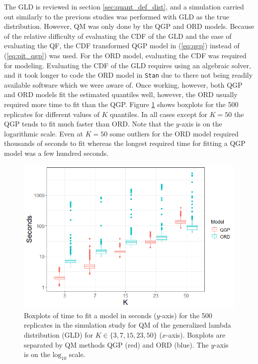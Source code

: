 \documentclass[preprint,12pt,authoryear]{elsarticle}
\begin{document}
The GLD is reviewed in section \ref{sec:quant_def_dist}, and a simulation carried out similarly to the previous studies was performed with GLD as the true distribution. However, QM was only done by the QGP and ORD models. Because of the relative difficulty of evaluating the CDF of the GLD and the ease of evaluating the QF, the CDF transformed QGP model in (\ref{eq:qgp}) instead of (\ref{eq:pit_qgp}) was used. For the ORD model, evaluating the CDF was required for modeling. Evaluating the CDF of the GLD requires using an algebraic solver, and it took longer to code the ORD model in \texttt{Stan} due to there not being readily available software which we were aware of. Once working, however, both QGP and ORD models fit the estimated quantiles well, however, the ORD usually required more time to fit than the QGP. Figure \ref{fig:tuk_time} shows boxplots for the 500 replicates for different values of $K$ quantiles. In all cases except for $K=50$ the QGP tends to fit much faster than ORD. Note that the $y$-axis is on the logarithmic scale. Even at $K=50$ some outliers for the ORD model required thousands of seconds to fit whereas the longest required time for fitting a QGP model was a few hundred seconds.


\begin{figure}[hbt!]
    \centering
    \includegraphics[scale=.6]{Images/tukey_time_log10.png}
    \caption{Boxplots of time to fit a model in seconds ($y$-axis) for the 500 replicates in the simulation study for QM of the generalized lambda distribution (GLD) for $K \in \{3, 7, 15, 23, 50\}$ ($x$-axis). Boxplots are separated by QM methods QGP (red) and ORD (blue). The $y$-axis is on the $\text{log}_{10}$ scale.}
    \label{fig:tuk_time}
\end{figure}
\end{document}
